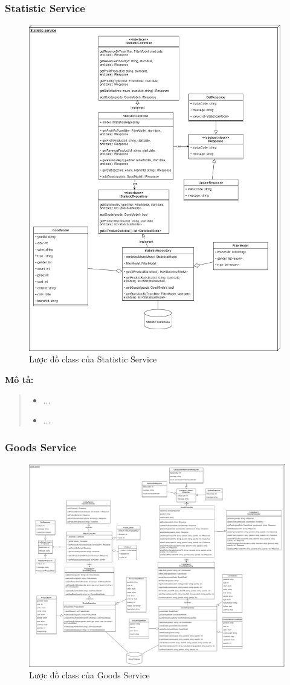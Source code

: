 \subsubsection{Statistic Service}
\begin{figure}[!htp]
	\centering
	\includegraphics[width=11cm]{img/Architecture/service/StatisticService.png}
	\newline
	\caption{Lược đồ class của Statistic Service}
\end{figure}
\textbf{Mô tả:}
\begin{quote}
	\begin{itemize}
		\item ...
		\item ...
	\end{itemize}
\end{quote}

\subsubsection{Goods Service}
\begin{figure}[!htp]
	\centering
	\includegraphics[width=17cm]{img/Architecture/service/GoodsService.png}
	\newline
	\caption{Lược đồ class của Goods Service}
\end{figure}

